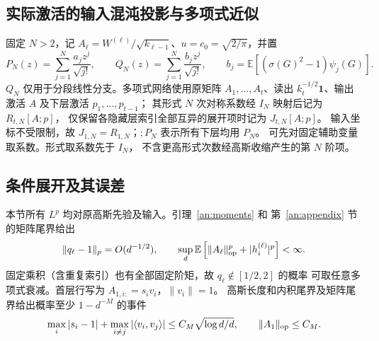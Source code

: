 \documentclass[a4paper]{tufte-handout}
\newcommand{\E}{\mathbb E}
\begin{document}
\begin{fullwidth}
\section{实际激活的输入混沌投影与多项式近似}
\label{fp:actual-section}\label{app:closure}
固定 $N>2$，记 $A_\ell=W^{(\ell)}/\sqrt{k_{\ell-1}}$、$u=c_0=\sqrt{2/\pi}$，并置
\begin{equation}\label{fp:actual-PQ}
 P_N(z)=\sum_{j=1}^N\frac{a_jz^j}{\sqrt{j!}},\qquad
 Q_N(z)=\sum_{j=1}^N\frac{b_jz^j}{\sqrt{j!}},\qquad
 b_j=\E[(\sigma(G)^2-1)\psi_j(G)].
\end{equation}
$Q_N$ 仅用于分段线性分支。多项式网络使用原矩阵 $A_1,\ldots,A_t$、读出
$k_t^{-1/2}\mathbf1$、输出激活 $A$ 及下层激活 $p_1,\ldots,p_{t-1}$；
其形式 $N$ 次对称系数经 $I_N$ 映射后记为 $R_{t,N}[A;p]$，
仅保留各隐藏层索引全部互异的展开项时记为 $J_{t,N}[A;p]$。
输入坐标不受限制，故 $J_{1,N}=R_{1,N}$；$;P_N$ 表示所有下层均用 $P_N$。
可先对固定辅助变量取系数。形式取系数先于 $I_N$，
不含更高形式次数经高斯收缩产生的第 $N$ 阶项。

\subsection{条件展开及其误差}
\label{fp:actual-finite-support}\label{fp:actual-positive}
本节所有 $L^p$ 均对原高斯先验及输入。引理~\ref{an:moments} 和
第~\ref{an:appendix} 节的矩阵尾界给出
\begin{equation}\label{fp:actual-local-interface}
 \|q_\ell-1\|_p=O(d^{-1/2}),\qquad
 \sup_d\E\left[\|A_\ell\|_{\rm op}^p+|h_i^{(\ell)}|^p\right]<\infty.
\end{equation}
固定乘积（含重复索引）也有全部固定阶矩，故 $q_\ell\notin[1/2,2]$ 的概率
可取任意多项式衰减。首层行写为 $A_{1,i:}=s_iv_i$，$\|v_i\|=1$。
高斯长度和内积尾界及矩阵尾界给出概率至少 $1-d^{-M}$ 的事件
\begin{equation}\label{fp:actual-row-event}
 \max_i|s_i-1|+\max_{i\ne j}|\langle v_i,v_j\rangle|
 \le C_M\sqrt{\log d/d},\qquad \|A_1\|_{\rm op}\le C_M.
\end{equation}


\end{fullwidth}
\end{document}
